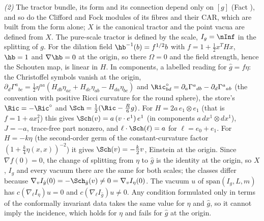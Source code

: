 \emph{(2)} The tractor bundle, its form and its connection depend only on $[g]$ (Fact ), and so do the Clifford and Fock modules of its fibres and their CAR, which are built from the form alone; $X$ is the canonical tractor and the point vacua are defined from $X$. The pure-scale tractor is defined by the scale, $I_{g} = \nInf$ in the splitting of $g$. For the dilation field $\hb^{-1}(b) = f^{1/2}b$ with $f = 1 + \tfrac12 x^{T}Hx$, $\hb = 1$ and $\nabla\hb = 0$ at the origin, so there $\Omega = 0$ and the field strength, hence the Schouten map, is linear in $H$. In components, a labelled reading for $\hat g = f\eta$: the Christoffel symbols vanish at the origin, $\partial_{d}\Gamma^{a}{}_{bc} = \tfrac12\eta^{aa}(H_{db}\eta_{ac} + H_{dc}\eta_{ab} - H_{da}\eta_{bc})$ and $\Ric^{\circ}_{bd} = \partial_{a}\Gamma^{a}{}_{db} - \partial_{d}\Gamma^{a}{}_{ab}$ (the convention with positive Ricci curvature for the round sphere), the store's $\Ric = -\Ric^{\circ}$ and $\Sch = \tfrac12(\Ric - \tfrac{R}{6}g)$. For $H = 2a\,e_{1}\otimes e_{1}$ (that is $f = 1 + a x_{1}^{2}$) this gives $\Sch(v) = a\,(v\cdot e^{1})\,e^{1}$ (in components $a\,dx^{1}\otimes dx^{1}$), $J = -a$, trace-free part nonzero, and $\ell\cdot\Sch(\ell) = a$ for $\ell = e_{0} + e_{1}$. For $H = -k\eta$ (the second-order germ of the constant-curvature factor $(1 + \tfrac{k}{4}\eta(x,x))^{-2}$) it gives $\Sch(v) = -\tfrac{k}{2}v$, Einstein at the origin. Since $\nabla f(0) = 0$, the change of splitting from $\eta$ to $\hat g$ is the identity at the origin, so $X$, $I_{g}$ and every vacuum there are the same for both scales; the classes differ because $\nabla_{v}I_{\hat g}(0) = -\Sch_{\hat g}(v) \ne 0 = \nabla_{v}I_{\eta}(0)$. The vacuum $u$ of $\mathrm{span}(I_{g}, L, m)$ has $c(\nabla_{\ell}I_{\eta})u = 0$ and $c(\nabla_{\ell}I_{\hat g})u \neq 0$. Any condition formulated only in terms of the conformally invariant data takes the same value for $\eta$ and $\hat g$, so it cannot imply the incidence, which holds for $\eta$ and fails for $\hat g$ at the origin.

